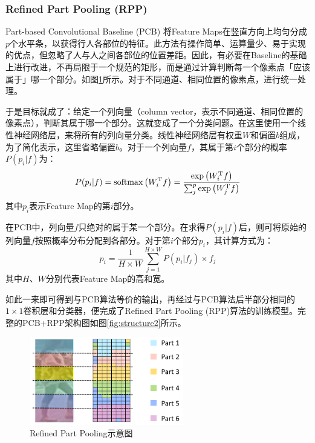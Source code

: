 \subsubsection{Refined Part Pooling (RPP)}
Part-based Convolutional Baseline (PCB) 将Feature Maps在竖直方向上均匀分成$p$个水平条，以获得行人各部位的特征。此方法有操作简单、运算量少、易于实现的优点，但忽略了人与人之间各部位的位置差距。因此，有必要在Baseline的基础上进行改进，不再局限于一个规范的矩形，而是通过计算判断每一个像素点「应该属于」哪一个部分。如图\ref{fig:refined}所示。对于不同通道、相同位置的像素点，进行统一处理。

于是目标就成了：给定一个列向量（column vector，表示不同通道、相同位置的像素点），判断其属于哪一个部分。这就变成了一个分类问题。在这里使用一个线性神经网络层，来将所有的列向量分类。线性神经网络层有权重$W$和偏置$b$组成，为了简化表示，这里省略偏置$b$。对于一个列向量$f$，其属于第$i$个部分的概率$P(p_i|f)$为：
\begin{equation}
P(p_i|f)=\mathop{\rm softmax}\left(W_i^{\rm T}f\right)=\frac{\exp\left(W_i^{\rm T}f\right)}{\sum_j^p\exp\left(W_j^{\rm T}f\right)}
\end{equation}
其中$p_i$表示Feature Map的第$i$部分。

在PCB中，列向量$f$只绝对的属于某一个部分。在求得$P(p_i|f)$后，则可将原始的列向量$f$按照概率分布分配到各部分。对于第$i$个部分$p_i$，其计算方式为：
\begin{equation}
p_i=\frac{1}{H\times W}\sum_{j=1}^{H\times W}P(p_i|f_j)\times f_j
\end{equation}
其中$H$、$W$分别代表Feature Map的高和宽。

如此一来即可得到与PCB算法等价的输出，再经过与PCB算法后半部分相同的$1\times1$卷积层和分类器，便完成了Refined Part Pooling (RPP)算法的训练模型。完整的PCB+RPP架构图如图\ref{fig:structure2}所示。

\begin{figure}
\centering
\includegraphics[width=0.6\textwidth]{figure/outliers1}
\caption{Refined Part Pooling示意图}
\label{fig:refined}
\end{figure}

